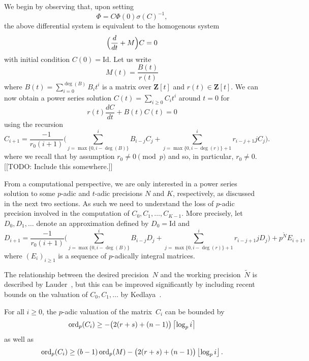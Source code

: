We begin by observing that, upon setting 
\begin{equation}
\Phi = C \Phi(0) \sigma(C)^{-1},
\end{equation}
the above differential system is equivalent to the homogenous system 
\begin{equation} \label{eq:de}
\Bigl(\frac{d}{dt} + M\Bigr) C = 0
\end{equation}
with initial condition $C(0) = \text{Id}$.  Let us write 
\begin{equation}
M(t) = \frac{B(t)}{r(t)}
\end{equation}
where $B(t) = \sum_{i=0}^{\deg(B)} B_i t^i$ is a matrix over $\mathbf{Z}[t]$ 
and $r(t) \in \mathbf{Z}[t]$.  We can now obtain a power series solution 
$C(t) = \sum_{i \geq 0} C_i t^i$ around $t=0$ for 
\begin{equation}
r(t) \frac{dC}{dt} + B(t) C(t) = 0
\end{equation}
using the recursion 
\begin{equation}
C_{i+1} = \frac{-1}{r_0 (i+1)} \biggl(
    \sum_{j=\max{\{0,i-\deg(B)\}}}^i B_{i-j} C_j + 
    \sum_{j=\max{\{0,i-\deg(r)\}}+1}^i r_{i-j+1} j C_j \biggr).
\end{equation}
where we recall that by assumption $r_0 \neq 0 \pmod{p}$ and so, 
in particular, $r_0 \neq 0$.  [[TODO:  Include this somewhere.]]

From a computational perspective, we are only interested in a power 
series solution to some $p$-adic and $t$-adic precisions $N$ and $K$, 
respectively, as discussed in the next two sections.  As such we need 
to understand the loss of $p$-adic precision involved in the computation 
of $C_0, C_1, \dotsc, C_{K-1}$.  More precisely, let $D_0, D_1, \dotsc$ 
denote an approximation defined by $D_0 = \text{Id}$ and 
\begin{equation}
D_{i+1} = \frac{-1}{r_0 (i+1)} \biggl(
    \sum_{j=\max{\{0,i-\deg(B)\}}}^i B_{i-j} D_j + 
    \sum_{j=\max{\{0,i-\deg(r)\}}+1}^i r_{i-j+1} j D_j \biggr) + 
    p^{\tilde{N}} E_{i+1},
\end{equation}
where $(E_i)_{i \geq 1}$ is a sequence of $p$-adically integral matrices. 

The relationship between the desired precision~$N$ and the working 
precision~$\tilde{N}$ is described by Lauder~\citep[Theorem~5.1]{Lauder2006}, 
but this can be improved significantly by including recent bounds on the 
valuation of $C_0, C_1, \dotsc$ by Kedlaya~\citep{Kedlaya2010}.

\begin{thm} \label{thm:valC}
For all $i \geq 0$, the $p$-adic valuation of the matrix~$C_i$ 
can be bounded by 
\begin{equation}
\operatorname{ord}_p(C_i) \geq - \bigl(2 (r + s) + (n - 1)\bigr) \left\lceil\log_p i\right\rceil
\end{equation}
as well as 
\begin{equation}
\operatorname{ord}_p(C_i) \geq (b - 1) \operatorname{ord}_p(M) - \bigl(2 (r + s) + (n - 1)\bigr) \left\lfloor\log_p i\right\rfloor.
\end{equation}
\end{thm}

